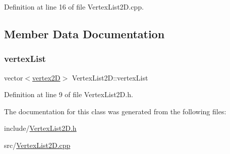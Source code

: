 Definition at line 16 of file Vertex\+List2\+D.\+cpp.



\subsection{Member Data Documentation}
\mbox{\label{class_vertex_list2_d_aeb7d8ca4a85b8e0f2bf495e44e52e9e6}} 
\subsubsection{\texorpdfstring{vertex\+List}{vertexList}}
{\footnotesize\ttfamily vector$<$\mbox{\hyperlink{structvertex2_d}{vertex2D}}$>$ Vertex\+List2\+D\+::vertex\+List}



Definition at line 9 of file Vertex\+List2\+D.\+h.



The documentation for this class was generated from the following files\+:\begin{DoxyCompactItemize}
\item 
include/\mbox{\hyperlink{_vertex_list2_d_8h}{Vertex\+List2\+D.\+h}}\item 
src/\mbox{\hyperlink{_vertex_list2_d_8cpp}{Vertex\+List2\+D.\+cpp}}\end{DoxyCompactItemize}
